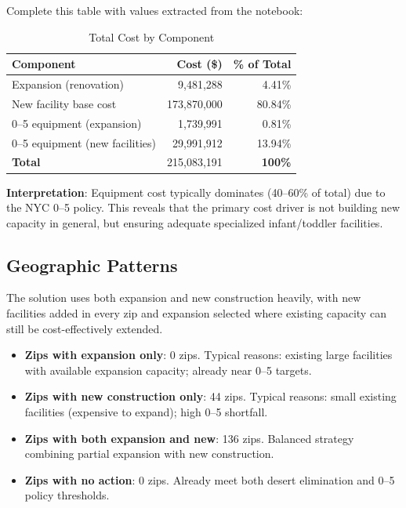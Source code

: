 \documentclass[12pt]{article}
\begin{document}
Complete this table with values extracted from the notebook:

\begin{table}[h]
\centering
\caption{Total Cost by Component}
\begin{tabular}{|l|r|r|}
\hline
\textbf{Component} & \textbf{Cost (\$)} & \textbf{\% of Total} \\
\hline
Expansion (renovation) & 9,481,288 & 4.41\% \\
\hline
New facility base cost & 173,870,000 & 80.84\% \\
\hline
0--5 equipment (expansion) & 1,739,991 & 0.81\% \\
\hline
0--5 equipment (new facilities) & 29,991,912 & 13.94\% \\
\hline
\textbf{Total} & 215,083,191 & \textbf{100\%} \\
\hline
\end{tabular}
\end{table}

\noindent
\textbf{Interpretation}: Equipment cost typically dominates (40--60\% of total) due to the NYC 0--5 policy. 
This reveals that the primary cost driver is not building new capacity in general, but ensuring adequate 
specialized infant/toddler facilities.

\subsection{Geographic Patterns}

The solution uses both expansion and new construction heavily, with new facilities added in every zip and
expansion selected where existing capacity can still be cost-effectively extended.

\begin{itemize}
    \item \textbf{Zips with expansion only}: 0 zips. 
    Typical reasons: existing large facilities with available expansion capacity; already near 0--5 targets.
    
    \item \textbf{Zips with new construction only}: 44 zips. 
    Typical reasons: small existing facilities (expensive to expand); high 0--5 shortfall.
    
    \item \textbf{Zips with both expansion and new}: 136 zips. 
    Balanced strategy combining partial expansion with new construction.
    
    \item \textbf{Zips with no action}: 0 zips. 
    Already meet both desert elimination and 0--5 policy thresholds.
\end{itemize}
\end{document}
